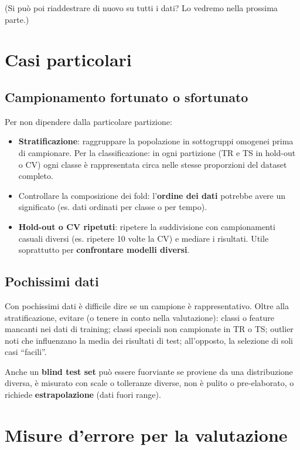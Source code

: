 (Si può poi riaddestrare di nuovo su tutti i dati? Lo vedremo nella
prossima parte.)

\section{Casi particolari}\label{casi-particolari}

\subsection{Campionamento fortunato o
sfortunato}\label{campionamento-fortunato-o-sfortunato}

Per non dipendere dalla particolare partizione:

\begin{itemize}
\tightlist
\item
  \textbf{Stratificazione}: raggruppare la popolazione in sottogruppi
  omogenei prima di campionare. Per la classificazione: in ogni
  partizione (TR e TS in hold-out o CV) ogni classe è rappresentata
  circa nelle stesse proporzioni del dataset completo.
\item
  Controllare la composizione dei fold: l'\textbf{ordine dei dati}
  potrebbe avere un significato (es. dati ordinati per classe o per
  tempo).
\item
  \textbf{Hold-out o CV ripetuti}: ripetere la suddivisione con
  campionamenti casuali diversi (es. ripetere 10 volte la CV) e mediare
  i risultati. Utile soprattutto per \textbf{confrontare modelli
  diversi}.
\end{itemize}

\subsection{Pochissimi dati}\label{pochissimi-dati}

Con pochissimi dati è difficile dire se un campione è rappresentativo.
Oltre alla stratificazione, evitare (o tenere in conto nella
valutazione): classi o feature mancanti nei dati di training; classi
speciali non campionate in TR o TS; outlier noti che influenzano la
media dei risultati di test; all'opposto, la selezione di soli casi
``facili''.

Anche un \textbf{blind test set} può essere fuorviante se proviene da
una distribuzione diversa, è misurato con scale o tolleranze diverse,
non è pulito o pre-elaborato, o richiede \textbf{estrapolazione} (dati
fuori range).

\section{Misure d'errore per la
valutazione}\label{misure-derrore-per-la-valutazione}


